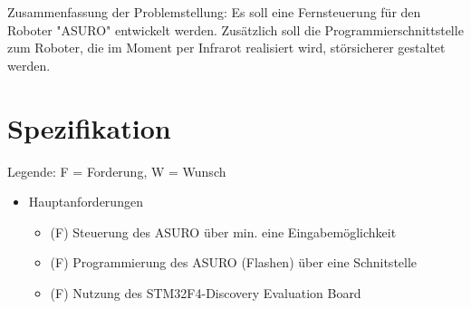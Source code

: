Zusammenfassung der Problemstellung: Es soll eine Fernsteuerung für den Roboter "ASURO" entwickelt werden. Zusätzlich soll die Programmierschnittstelle zum Roboter, die im Moment per Infrarot realisiert wird, störsicherer gestaltet werden.

\section{Spezifikation}
Legende: F = Forderung, W = Wunsch
\begin{itemize}
	\item Hauptanforderungen
	\begin{itemize}
		\item (F) Steuerung des ASURO über min. eine Eingabemöglichkeit
		\item (F) Programmierung des ASURO (Flashen) über eine Schnitstelle	
		\item (F) Nutzung des STM32F4-Discovery Evaluation Board
	\end{itemize}


\end{itemize}
